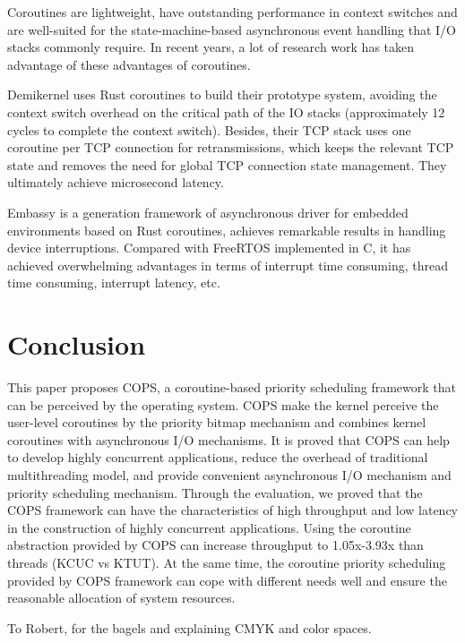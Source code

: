 \documentclass[sigconf,review,anonymous]{acmart}
\begin{document}
Coroutines are lightweight, have outstanding performance in context switches and are well-suited for the state-machine-based asynchronous event handling that I/O stacks commonly require. In recent years, a lot of research work has taken advantage of these advantages of coroutines.

Demikernel\cite{zhang_demikernel_2021} uses Rust coroutines to build their prototype system, avoiding the context switch overhead on the critical path of the IO stacks (approximately 12 cycles to complete the context switch). Besides, their TCP stack uses one coroutine per TCP connection for retransmissions, which keeps the relevant TCP state and removes the need for global TCP connection state management. They ultimately achieve microsecond latency.

Embassy\cite{embassy} is a generation framework of asynchronous driver for embedded environments based on Rust coroutines, achieves remarkable results in handling device interruptions. Compared with FreeRTOS implemented in C, it has achieved overwhelming advantages in terms of interrupt time consuming, thread time consuming, interrupt latency, etc.

\section{Conclusion}
\label{section: Conclusion}

This paper proposes COPS, a coroutine-based priority scheduling framework that can be perceived by the operating system. COPS make the kernel perceive the user-level coroutines by the priority bitmap mechanism and combines kernel coroutines with asynchronous I/O mechanisms. It is proved that COPS can help to develop highly concurrent applications, reduce the overhead of traditional multithreading model, and provide convenient asynchronous I/O mechanism and priority scheduling mechanism. Through the evaluation, we proved that the COPS framework can have the characteristics of high throughput and low latency in the construction of highly concurrent applications. Using the coroutine abstraction provided by COPS can increase throughput to 1.05x-3.93x than threads (KCUC vs KTUT). At the same time, the coroutine priority scheduling provided by COPS framework can cope with different needs well and ensure the reasonable allocation of system resources.

\begin{acks}
To Robert, for the bagels and explaining CMYK and color spaces.
\end{acks}





\appendix
\end{document}
